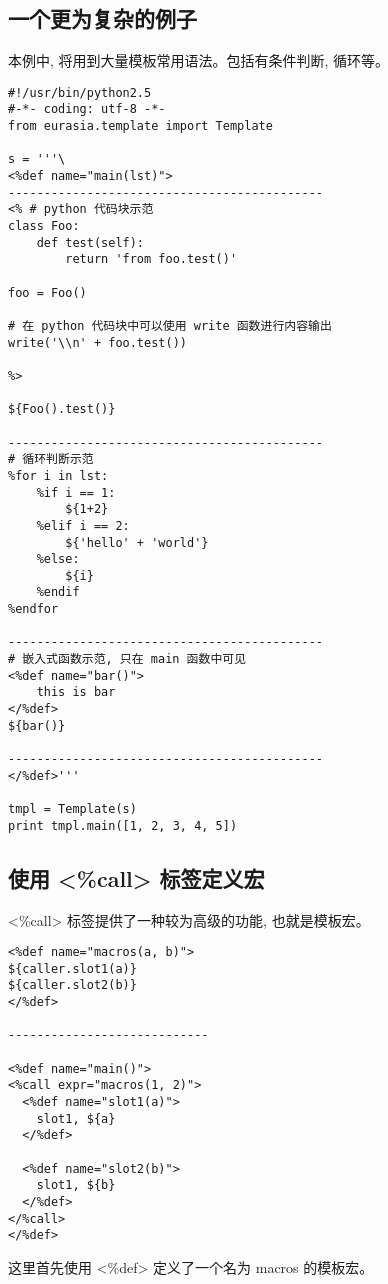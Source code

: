 \documentclass{manual}
\begin{document}
\subsection{一个更为复杂的例子}

本例中, 将用到大量模板常用语法。包括有条件判断, 循环等。

\begin{verbatim}
#!/usr/bin/python2.5
#-*- coding: utf-8 -*-
from eurasia.template import Template

s = '''\
<%def name="main(lst)">
--------------------------------------------
<% # python 代码块示范
class Foo:
	def test(self):
		return 'from foo.test()'

foo = Foo()

# 在 python 代码块中可以使用 write 函数进行内容输出
write('\\n' + foo.test())

%>

${Foo().test()}

--------------------------------------------
# 循环判断示范
%for i in lst:
	%if i == 1:
		${1+2}
	%elif i == 2:
		${'hello' + 'world'}
	%else:
		${i}
	%endif
%endfor

--------------------------------------------
# 嵌入式函数示范, 只在 main 函数中可见
<%def name="bar()">
	this is bar
</%def>
${bar()}

--------------------------------------------
</%def>'''

tmpl = Template(s)
print tmpl.main([1, 2, 3, 4, 5])
\end{verbatim}

\subsection{使用 <\%call> 标签定义宏}

<\%call> 标签提供了一种较为高级的功能, 也就是模板宏。

\begin{verbatim}
<%def name="macros(a, b)">
${caller.slot1(a)}
${caller.slot2(b)}
</%def>

----------------------------

<%def name="main()">
<%call expr="macros(1, 2)">
  <%def name="slot1(a)">
    slot1, ${a}
  </%def>

  <%def name="slot2(b)">
    slot1, ${b}
  </%def>
</%call>
</%def>
\end{verbatim}

这里首先使用 <\%def> 定义了一个名为 macros 的模板宏。
\end{document}
